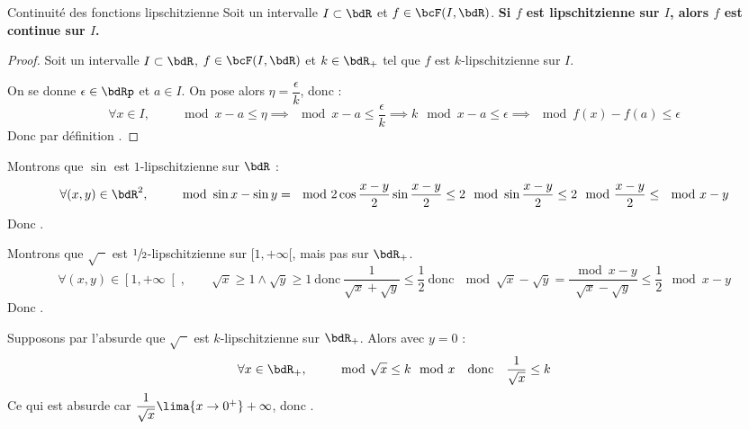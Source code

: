 \documentclass[a4paper,french,bookmarks]{article}
\begin{document}
\begin{enumerate}
{        \begin{property*}{Continuité des fonctions lipschitzienne}{}
            Soit un intervalle $I \subset \bdR$ et $f \in \bcF(I, \bdR)$. \bf{Si $f$ est lipschitzienne sur $I$, alors $f$ est continue sur $I$}.
        \end{property*}
        
        \begin{proof}
            Soit un intervalle $I \subset \bdR$, $f \in \bcF(I, \bdR)$ et $k \in \bdR_+$ tel que $f$ est $k$-lipschitzienne sur $I$.
            
            On se donne $\epsilon \in \bdRp$ et $a \in I$. On pose alors $\eta = \dfrac{\epsilon}{k}$, donc :
            \[ \forall x \in I,\qquad \mod{x - a} \leq \eta \implies \mod{x - a} \leq \dfrac{\epsilon}{k} \implies k\mod{x - a} \leq \epsilon \implies \mod{f(x) - f(a)} \leq \epsilon\]
            Donc par définition .
        \end{proof}
        
        \begin{enumerate}
            \itb Montrons que $\sin$ est $1$-lipschitzienne sur $\bdR$ :
            \[ \forall (x, y) \in \bdR^2,\qquad \mod{\sin x - \sin y} = \mod{2\cos{\dfrac{x-y}{2}}\sin{\dfrac{x-y}{2}}} \leq 2\mod{\sin{\dfrac{x-y}{2}}} \leq 2\mod{\dfrac{x-y}{2}} \leq \mod{x-y}\]
            Donc .
        
            \itb Montrons que $\sqrt{\phantom{x}}$ est $\sfrac{1}{2}$-lipschitzienne sur $[1,+\infty[$, mais pas sur $\bdR_+$.
            \[ \forall (x, y) \in \left[1, +\infty\right[,\qquad \sqrt{x} \geq 1 \land \sqrt{y} \geq 1 \ \text{donc} \ \dfrac{1}{\sqrt{x} + \sqrt{y}} \leq \dfrac{1}{2} \ \text{donc} \ \mod{\sqrt{x} - \sqrt{y}} = \dfrac{\mod{x - y}}{\sqrt{x} - \sqrt{y}} \leq \dfrac{1}{2}\mod{x - y}\]
            Donc \boxsol{$\sqrt{\phantom{x}}$ est $\sfrac{1}{2}$-lipschitzienne sur $[1,+\infty[$}.
            
            Supposons par l'absurde que $\sqrt{\phantom{x}}$ est $k$-lipschitzienne sur $\bdR_+$. Alors avec $y = 0$ :
            \[ \forall x \in \bdR_+,\qquad \mod{\sqrt{x}} \leq k\mod{x} \quad \text{donc} \quad \dfrac{1}{\sqrt{x}} \leq k\]
            Ce qui est absurde car $\dfrac{1}{\sqrt{x}} \lima{x \to 0^+} +\infty$, donc .
        \end{enumerate}
    }
    

\end{enumerate}
\end{document}
